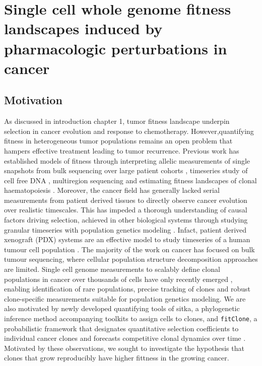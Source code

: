 
{\chapter{Single  cell  whole genome fitness  landscapes  induced  by pharmacologic perturbations in cancer}
}
\label{ch:Chapter4}

\section{Motivation}
As discussed in introduction chapter 1, tumor fitness landscape underpin selection in cancer evolution and response to chemotherapy. However,quantifying fitness in heterogeneous tumor populations remains an open problem that hampers effective treatment leading to tumor recurrence. Previous work has established models of fitness through interpreting allelic measurements of single snapshots \cite{williams2016identification, williams2018quantification,gerstung2020evolutionary,shah2012clonal,nik2012life} from bulk sequencing over large patient cohorts \cite{martincorena2017universal}, timeseries study of cell free DNA \cite{khan2018longitudinal}, multiregion sequencing \cite{Gerlinger2014-qd,Jamal-Hanjani2017-yc,Lopez2020-ku,mcpherson2016divergent,williams2018quantification} and estimating fitness landscapes of clonal haematopoiesis \cite{Watson2020-yu}. Moreover, the cancer field has generally lacked serial measurements from patient derived tissues to directly observe cancer evolution over realistic timescales. This has impeded a thorough understanding of causal factors driving selection, achieved in other biological systems through studying granular timeseries with population genetics modeling \cite{good2017dynamics}. Infact, patient derived xenograft (PDX) systems are an effective model to study timeseries of a human tumour cell population \cite{williams2018using,willey2015patient}.
The majority of the work on cancer has focused on bulk tumour sequencing, where cellular population structure decomposition approaches are limited. Single cell genome measurements to scalably define clonal populations in cancer over thousands of cells have only recently emerged \cite{Laks2019-dm,zahn2017scalable}, enabling identification of rare populations, precise tracking of clones and robust clone-specific measurements suitable for population genetics modeling. We are also motivated by newly developed quantifying tools of sitka, a phylogenetic inference method accompanying toolkits to assign cells to clones, \cite{dorri2020efficient} and  \texttt{fitClone}, a probabilistic framework that designates quantitative selection coefficients to individual cancer clones and forecasts competitive clonal dynamics over time \cite{salehi2020single}. Motivated by these observations, we sought to investigate the hypothesis that clones that grow reproducibly have higher fittness in the growing cancer.

